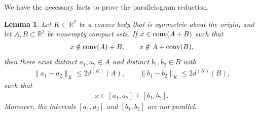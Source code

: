 \documentclass[11pt]{article}
\newtheorem{lemma}{Lemma}[section]
\begin{document}
We have the necessary facts to prove the parallelogram reduction.

\begin{lemma}\label{lemma:parallelogram_reduction_K_norm}
        Let $K\subset\mathbb{R}^2$ be a convex body that is symmetric about the origin, and let $A,B\subset\mathbb{R}^2$ be nonempty compact sets. If $x\in \textup{conv}(A+B)$ such that 
        \begin{align*}
            x\notin \textup{conv}(A)+B,\qquad x\notin A+\textup{conv}(B),
        \end{align*}
        then there exist distinct $a_1,a_2\in A$ and distinct $b_1,b_2\in B$ with
        \begin{align*}
            \|a_1-a_2\|_K\leq 2d^{(K)}(A),\qquad \|b_1-b_2\|_K\leq 2d^{(K)}(B),
        \end{align*}
        such that 
        \begin{align*}
            x\in [a_1,a_2]+[b_1,b_2].
        \end{align*}
        Moreover, the intervals $[a_1,a_2]$ and $[b_1,b_2]$ are not parallel.
\end{lemma}
\end{document}
